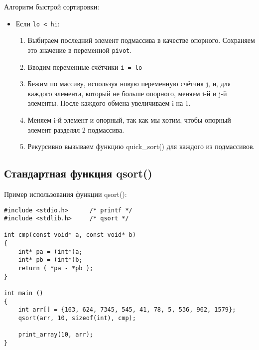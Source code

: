 \documentclass{article}
\begin{document}
\begin{enumerate}
Алгоритм быстрой сортировки:
\begin{itemize}
\item Если \texttt{lo < hi}:
	\begin{enumerate}
	\item Выбираем последний элемент подмассива в качестве опорного. Сохраняем это значение в переменной \texttt{pivot}.
	\item Вводим переменные-счётчики \texttt{i = lo}
	\item Бежим по массиву, используя новую переменную счётчик j, и, для каждого элемента, который не больше опорного, меняем i-й и j-й элементы. После каждого обмена увеличиваем i на 1.
	\item Меняем i-й элемент и опорный, так как мы хотим, чтобы опорный элемент разделял 2 подмассива.
	\item Рекурсивно вызываем функцию quick\_sort() для каждого из подмассивов.
	\end{enumerate}
\end{itemize}
\end{enumerate}

\newpage
\subsection*{Стандартная функция qsort()}

Пример использования функции qsort():
\begin{verbatim}
#include <stdio.h>      /* printf */
#include <stdlib.h>     /* qsort */

int cmp(const void* a, const void* b)
{
    int* pa = (int*)a;
    int* pb = (int*)b;
    return ( *pa - *pb );
}

int main ()
{
    int arr[] = {163, 624, 7345, 545, 41, 78, 5, 536, 962, 1579};
    qsort(arr, 10, sizeof(int), cmp);
   
    print_array(10, arr);
}
\end{verbatim}
\end{document}
